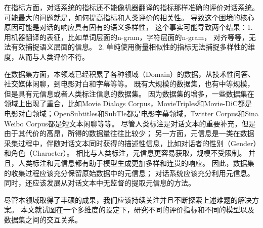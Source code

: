 在指标方面，对话系统的指标还不能像机器翻译的指标那样准确的评价对话系统。
可能最大的问题就是，如何提高指标和人类评价的相关性。
导致这个困境的核心原因可能是对话的响应具有固有的语义多样性，
这个事实可能导致两个结果：1. 用机器翻译的表征，比如单词层面的n-gram，字符层面的n-gram，
对齐等等，无法有效捕捉语义层面的信息。
2. 单纯使用衡量相似性的指标无法捕捉多样性的维度，从而与人类评价不符。

在数据集方面，本领域已经积累了各种领域（Domain）的数据，从技术性问答、社交媒体闲聊，到电影对白和字幕等等。
既有大规模的数据集，也有中等规模，但是具有元信息或者人类标注信息的数据集。
因为数据集的增多，一些数据集在领域上出现了重合，比如Movie Dialogs Corpus，MovieTriples和Movie-DiC都是
电影对白领域；OpenSubtitles和SubTle都是电影字幕领域，Twitter Corpus和Sina Weibo Corpus都是短文本闲聊等等。
尽管人类标注是对话文本的重要补充，但是由于其代价的高昂，所得的数据量往往比较少；
另一方面，元信息是一类在数据采集过程中，伴随对话文本同时获得的描述性信息，比如对话者的性别（Gender）和角色（Character）。
相比与人类标注，元信息更容易获取，规模不受限制。
并且，人类标注和元信息都有助于模型生成更加多样和连贯的响应。
因此，数据集的收集过程应该充分保留原始数据中的元信息； 对话系统应该充分利用元信息。
同时，还应该发展从对话文本中无监督的提取元信息的方法。

尽管本领域取得了丰硕的成果，我们应该持续关注并且不断探索上述难题的解决方案。
本文就试图在一个多维度的设定下，研究不同的评价指标和不同的模型以及数据集之间的交互关系。
